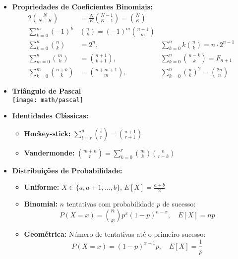 \begin{small}
\begin{itemize}
    \item \textbf{Propriedades de Coeficientes Binomiais:}
    \begin{alignat*}{2}
        \binom{N}{N - K} &= \frac{N}{K} \binom{N - 1}{K - 1} = \binom{N}{K}   &\\
        \sum_{k=0}^{m} (-1)^k & \binom{n}{k} = (-1)^m  \binom{n - 1}{m}       &\\
        \sum_{k=0}^{n} \binom{n}{k} &= 2^n     ,                              &
        \sum_{k=0}^{n} k \binom{n}{k} = n \cdot 2^{n - 1}                      \\
        \sum_{m=0}^{n} \binom{m}{k} &= \binom{n+1}{k+1}  ,                    &
        \sum_{k=0}^{n} \binom{n-k}{k} = F_{n+1}                                \\
        \sum_{k=0}^{m} \binom{n + k}{k} &= \binom{n + m + 1}{m}  ,            &
        \sum_{k=0}^{n} \binom{n}{k}^2 = \binom{2n}{n}
    \end{alignat*}

    \item \textbf{Triângulo de Pascal} \\[0.5ex]
    \texttt{[image: math/pascal]}

    \item \textbf{Identidades Clássicas:}
    \begin{itemize}
        \item \textbf{Hockey-stick:} $\sum_{i=r}^{n} \binom{i}{r} = \binom{n+1}{r+1}$
        \item \textbf{Vandermonde:} $\binom{m+n}{r} = \sum_{k=0}^{r} \binom{m}{k} \binom{n}{r-k}$
    \end{itemize}

    \item \textbf{Distribuições de Probabilidade:}
    \begin{itemize}
        \item \textbf{Uniforme:} $X \in \{a, a+1, \dots, b\}$, $E[X] = \frac{a + b}{2}$
        \item \textbf{Binomial:} $n$ tentativas com probabilidade $p$ de sucesso:
        \[
        P(X = x) = \binom{n}{x} p^x (1 - p)^{n - x}, \quad E[X] = np
        \]
        \item \textbf{Geométrica:} Número de tentativas até o primeiro sucesso:
        \[
        P(X = x) = (1 - p)^{x - 1} p, \quad E[X] = \frac{1}{p}
        \]
    \end{itemize}

\end{itemize}
\end{small}

